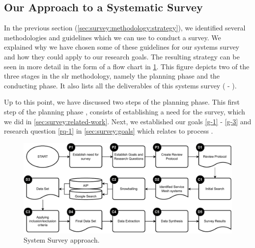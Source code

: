 \subsection{Our Approach to a Systematic Survey}
\label{sec:survey:methodology:approach}

In the previous section (\cref{sec:survey:methodology:strategy}), we identified several methodologies and guidelines which we can use to conduct a survey. We explained why we have chosen some of these guidelines for our systems survey and how they could apply to our research goals. The resulting strategy can be seen in more detail in the form of a flow chart in  \cref{fig:survey-methodology}. This figure depicts two of the three stages in the \gls{slr} methodology, namely the planning phase and the conducting phase. It also lists all the deliverables of this systems survey ( - ). 

Up to this point, we have discussed two steps of the planning phase. This first step of the planning phase , consists of establishing a need for the survey, which we did in \cref{sec:survey:related-work}. Next, we established our goals \ref{g-1} - \ref{g-3} and research question \ref{rq-1} in \cref{sec:survey:goals} which relates to process .




\begin{figure}[!t]
    \centering
    
    \includegraphics[width=\linewidth]{3_systems_survey/figures/survey-methodology}

    \caption{System Survey approach.}
    \label{fig:survey-methodology}
\end{figure}





